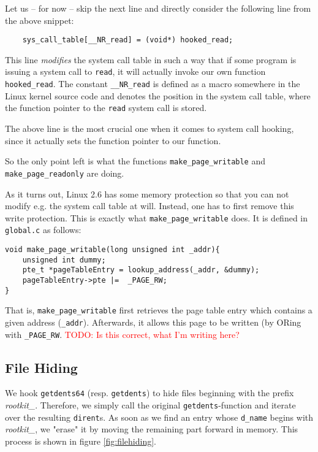 \documentclass[10pt, letterpaper]{article}
\newcommand{\todo}[1]{\textcolor{red}{TODO: #1}}
\begin{document}
Let us -- for now -- skip the next line and directly consider the following line from the above snippet:

\begin{verbatim}
    sys_call_table[__NR_read] = (void*) hooked_read;
\end{verbatim}

This line \emph{modifies} the system call table in such a way that if some program is issuing a system call to \texttt{read}, it will actually invoke our own function \texttt{hooked\_read}. The constant \texttt{\_\_NR\_read} is defined as a macro somewhere in the Linux kernel source code and denotes the position in the system call table, where the function pointer to the \texttt{read} system call is stored.

The above line is the most crucial one when it comes to system call hooking, since it actually sets the function pointer to our function.

So the only point left is what the functions \texttt{make\_page\_writable} and \texttt{make\_page\_readonly} are doing.

As it turns out, Linux 2.6 has some memory protection so that you can not modify e.g. the system call table at will. Instead, one has to first remove this write protection. This is exactly what \texttt{make\_page\_writable} does. It is defined in \texttt{global.c} as follows:

\begin{verbatim}
void make_page_writable(long unsigned int _addr){
    unsigned int dummy;
    pte_t *pageTableEntry = lookup_address(_addr, &dummy);
    pageTableEntry->pte |=  _PAGE_RW;
}
\end{verbatim}

That is, \texttt{make\_page\_writable} first retrieves the page table entry which contains a given address (\texttt{\_addr}). Afterwards, it allows this page to be written (by ORing with \texttt{\_PAGE\_RW}. \todo{Is this correct, what I'm writing here?}

\subsection{File Hiding}
\label{filehiding}
We hook \texttt{getdents64} (resp. \texttt{getdents}) to hide files beginning with the prefix \textit{rootkit\_}. 
Therefore, we simply call the original \texttt{getdents}-function and iterate over the resulting
\texttt{dirent}s. As soon as we find an entry whose \texttt{d\_name} begins with \textit{rootkit\_},
we "erase" it by moving the remaining part forward in memory. This process is shown in figure \ref{fig:filehiding}.
\end{document}
